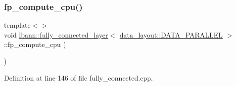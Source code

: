 \subsubsection{\texorpdfstring{fp\+\_\+compute\+\_\+cpu()}{fp\_compute\_cpu()}\hspace{0.1cm}{\footnotesize\ttfamily [2/3]}}
{\footnotesize\ttfamily template$<$$>$ \\
void \hyperlink{classlbann_1_1fully__connected__layer}{lbann\+::fully\+\_\+connected\+\_\+layer}$<$ \hyperlink{base_8hpp_a786677cbfb3f5677b4d84f3056eb08dba37d2a3465f7cbf4ab60f4e79944d0638}{data\+\_\+layout\+::\+D\+A\+T\+A\+\_\+\+P\+A\+R\+A\+L\+L\+EL} $>$\+::fp\+\_\+compute\+\_\+cpu (\begin{DoxyParamCaption}{ }\end{DoxyParamCaption})\hspace{0.3cm}{\ttfamily [private]}}



Definition at line 146 of file fully\+\_\+connected.\+cpp.


